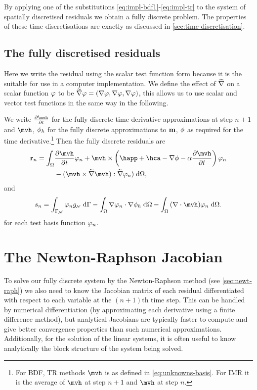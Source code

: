 {By applying one of the substitutions \cref{eq:impl-bdf1}-\cref{eq:impl-tr} to the system of spatially discretised residuals we obtain a fully discrete problem.
The properties of these time discretisations are exactly as discussed in \cref{sec:time-discretisation}.

\subsection{The fully discretised residuals}

Here we write the residual using the scalar test function form because it is the suitable for use in a computer implementation.
We define the effect of $\widetilde{\nabla}$ on a scalar function $\varphi$ to be $\widetilde{\nabla} \varphi = (\nabla \varphi, \nabla \varphi, \nabla \varphi)$, this allows us to use scalar and vector test functions in the same way in the following.

We write $\dmdth$ for the fully discrete time derivative approximations at step $n+1$ and $\mvh$, ${\phi}_h$ for the fully discrete approximations to $\boldsymbol{\mathrm{m}}$, $\phi$ as required for the time derivative.\footnote{For BDF, TR methods $\mvh$ is as defined in \cref{eq:unknowns-basis}. For IMR it is the average of $\mvh$ at step $n+1$ and $\mvh$ at step $n$.}
Then the fully discrete residuals are
\begin{equation}
  \label{res:llg-discrete}
  \begin{aligned}
    \rllgv_n = \int_{\magd}
    & \dmdth \tbf_n + \mvh \times \left( \happ + \hca - \grad \phim - \dampc \dmdth
    \right) \tbf_n \\
    &- (\mvh \times \gradv \mvh) : \gradv \tbf_n)
    \d\magd,
  \end{aligned}
\end{equation}
and
\begin{equation}
  \label{res:phi-discrete}
  \begin{aligned}
    \rphi_n = \int_{\boundd_\Neu} \tbf_n g_\Neu \d \boundd
    - \intd{ \grad \tbf_n \cdot \grad \phimh}
    - \intd{ (\div \mvh) \tbf_n}.
  \end{aligned}
\end{equation}
for each test basis function $\varphi_n$.

\section{The Newton-Raphson Jacobian}
\label{sec:llg-jacobian-calculation}

To solve our fully discrete system by the Newton-Raphson method (see \cref{sec:newt-raph}) we also need to know the Jacobian matrix of each residual differentiated with respect to each variable at the $(n+1)$th time step.
This can be handled by numerical differentiation (\eg by approximating each derivative using a finite difference method), but analytical Jacobians are typically faster to compute and give better convergence properties than such numerical approximations.
Additionally, for the solution of the linear systems, it is often useful to know analytically the block structure of the system being solved.

}
